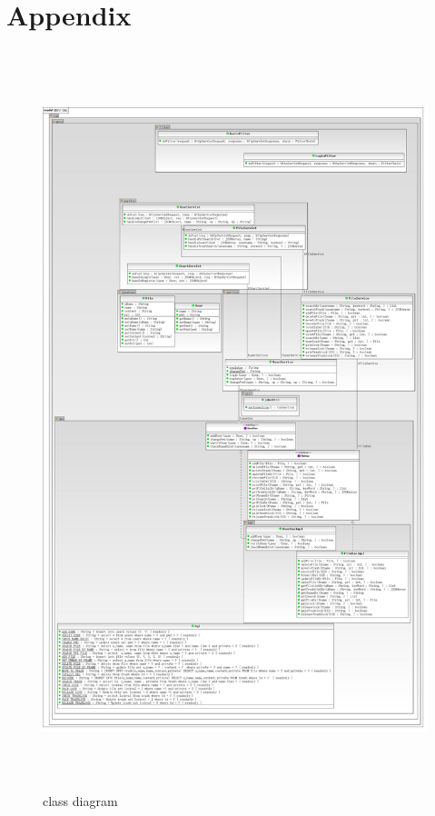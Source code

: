 \documentclass[a4paper,11pt]{article}
\begin{document}
\section{Appendix}
\begin{figure}[ht]

\centering
\includegraphics[width=16.5cm,height=21.5cm]{class.jpg}
\caption{class diagram}
\label{fig:2}
\end{figure}
\end{document}
